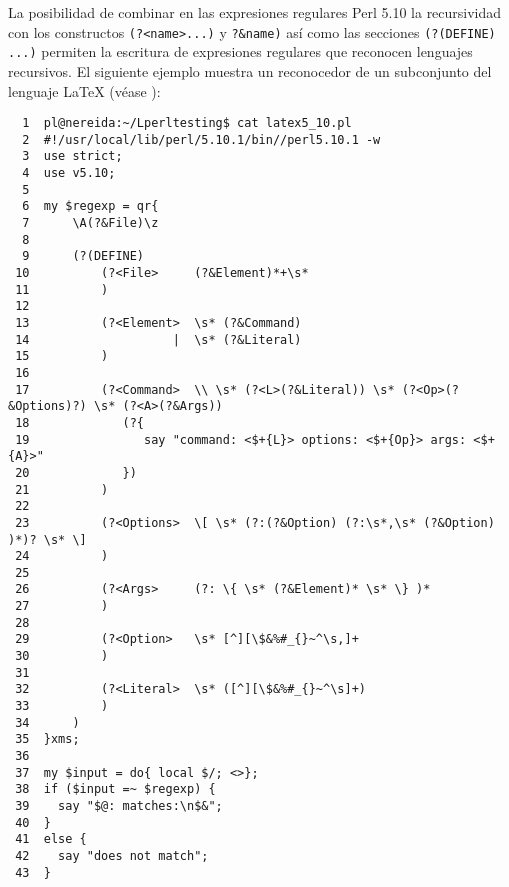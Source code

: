 \label{subsection:regexp510lenrec}

La posibilidad de combinar en las expresiones regulares Perl 5.10 
la recursividad con los constructos \verb|(?<name>...)| 
y \verb|?&name)| así como las secciones \verb|(?(DEFINE) ...)|
permiten la escritura de expresiones regulares que reconocen lenguajes recursivos. 
El siguiente 
ejemplo muestra un reconocedor de un subconjunto del lenguaje 
\LaTeX{} (véase ):

\begin{latexonly}
\begin{verbatim}
  1  pl@nereida:~/Lperltesting$ cat latex5_10.pl
  2  #!/usr/local/lib/perl/5.10.1/bin//perl5.10.1 -w
  3  use strict;
  4  use v5.10;
  5  
  6  my $regexp = qr{
  7      \A(?&File)\z
  8  
  9      (?(DEFINE)
 10          (?<File>     (?&Element)*+\s*
 11          )
 12  
 13          (?<Element>  \s* (?&Command)
 14                    |  \s* (?&Literal)
 15          )
 16  
 17          (?<Command>  \\ \s* (?<L>(?&Literal)) \s* (?<Op>(?&Options)?) \s* (?<A>(?&Args))
 18             (?{
 19                say "command: <$+{L}> options: <$+{Op}> args: <$+{A}>"
 20             })
 21          )
 22  
 23          (?<Options>  \[ \s* (?:(?&Option) (?:\s*,\s* (?&Option) )*)? \s* \]
 24          )
 25  
 26          (?<Args>     (?: \{ \s* (?&Element)* \s* \} )*
 27          )
 28  
 29          (?<Option>   \s* [^][\$&%#_{}~^\s,]+
 30          )
 31  
 32          (?<Literal>  \s* ([^][\$&%#_{}~^\s]+)
 33          )
 34      )
 35  }xms;
 36  
 37  my $input = do{ local $/; <>};
 38  if ($input =~ $regexp) {
 39    say "$@: matches:\n$&";
 40  }
 41  else {
 42    say "does not match";
 43  }
\end{verbatim}
\end{latexonly}

